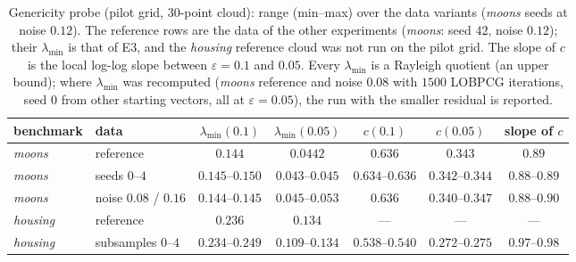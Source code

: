 \documentclass[11pt,leqno]{amsart}
\newcommand{\eps}{\varepsilon}
\numberwithin{equation}{section}
\theoremstyle{definition}
\begin{document}
\begin{table}[ht]
\centering\small
\begin{tabular}{l l cc ccc}
\toprule
benchmark & data & $\lambda_{\min}(0.1)$ & $\lambda_{\min}(0.05)$ &
$c(0.1)$ & $c(0.05)$ & slope of $c$\\
\midrule
\emph{moons}   & reference & $0.144$ & $0.0442$ & $0.636$ & $0.343$ & $0.89$\\
\emph{moons}   & seeds $0$--$4$ & $0.145$--$0.150$ & $0.043$--$0.045$ & $0.634$--$0.636$ & $0.342$--$0.344$ & $0.88$--$0.89$\\
\emph{moons}   & noise $0.08$ / $0.16$       & $0.144$--$0.145$ & $0.045$--$0.053$ & $0.636$ & $0.340$--$0.347$ & $0.88$--$0.90$\\
\emph{housing} & reference                    & $0.236$ & $0.134$ & --- & --- & ---\\
\emph{housing} & subsamples $0$--$4$          & $0.234$--$0.249$ & $0.109$--$0.134$ & $0.538$--$0.540$ & $0.272$--$0.275$ & $0.97$--$0.98$\\
\bottomrule
\end{tabular}
\vskip 2pt
\caption{Genericity probe (pilot grid, $30$-point cloud): range (min--max)
over the data variants (\emph{moons} seeds at noise $0.12$).  The
reference rows are the data of the other experiments (\emph{moons}: seed
$42$, noise $0.12$); their $\lambda_{\min}$ is that of E3, and the \emph{housing}
reference cloud was not run on the pilot grid.  The slope of $c$ is the
local log-log slope between $\eps=0.1$ and $0.05$.  Every $\lambda_{\min}$ is
a Rayleigh quotient (an upper bound); where $\lambda_{\min}$ was
recomputed (\emph{moons} reference and noise $0.08$ with $1500$ LOBPCG
iterations, seed $0$ from other starting vectors, all at $\eps=0.05$), the
run with the smaller residual is reported.}
\label{tab:genericity}
\end{table}
\end{document}

